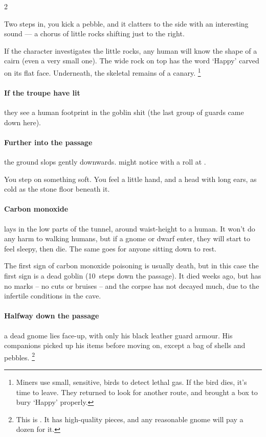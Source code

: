 \begin{multicols}{2}

\begin{boxtext}
  Two steps in, you kick a pebble, and it clatters to the side with an interesting sound --- a chorus of little rocks shifting just to the right.
\end{boxtext}

If the character investigates the little rocks, any human will know the shape of a cairn (even a very small one).
The wide rock on top has the word `Happy' carved on its flat face.
Underneath, the skeletal remains of a canary.
\footnote{Miners use small, sensitive, birds to detect lethal gas.  If the bird dies, it's time to leave.
They returned to look for another route, and brought a box to bury `Happy' properly.}

\paragraph{If the troupe have  lit}
they see a human footprint in the goblin shit (the last group of \glspl{guard} came down here).

\paragraph{Further into the passage}
the ground slops gently downwards.
 might notice with a  roll at \tn[8].

\begin{boxtext}
  You step on something soft.
  You feel a little hand, and a head with long ears, as cold as the stone floor beneath it.
\end{boxtext}

\paragraph{Carbon monoxide}
lays in the low parts of the tunnel, around waist-height to a human.
It won't do any harm to walking humans, but if a gnome or dwarf enter, they will start to feel sleepy, then die.
The same goes for anyone sitting down to rest.

The first sign of carbon monoxide poisoning is usually death, but in this case the first sign is a dead goblin (10~\glspl{step} down the passage).
It died weeks ago, but has no marks -- no cuts or bruises -- and the corpse has not decayed much, due to the infertile conditions in the cave.

\paragraph{Halfway down the passage}
a dead gnome lies face-up, with only his black leather \gls{guard} \gls{armour}.
His companions picked up his items before moving on, except a bag of shells and pebbles.%
\footnote{This is .  It has high-quality pieces, and any reasonable gnome will pay a dozen  for it.}


\end{multicols}
